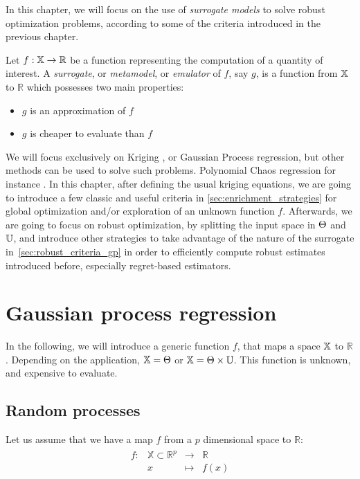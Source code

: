 \documentclass[../../Main_ManuscritThese.tex]{subfiles}
\begin{document}
 In this chapter, we will focus on the use of \emph{surrogate models} to solve robust optimization problems, according to some of the criteria introduced in the previous chapter.
\begin{definition}
  Let $f: \mathbb{X} \rightarrow \mathbb{R}$ be a function representing the computation of a quantity of interest. A \emph{surrogate}, or \emph{metamodel}, or \emph{emulator} of $f$, say $g$, is a function from $\mathbb{X}$ to $\mathbb{R}$ which possesses two main properties:
  \begin{itemize}
  \item $g$ is an approximation of $f$
  \item $g$ is cheaper to evaluate than $f$ 
  \end{itemize}
\end{definition}
We will focus exclusively on Kriging \cite{krige_statistical_1951,matheron_traite_1962}, or Gaussian Process regression, but other methods can be used to solve such problems. Polynomial Chaos regression for instance \cite{wiener_homogeneous_1938,xiu_wiener--askey_2002,sudret_polynomial_2015,miranda_adjoint-based_2016}.
In this chapter, after defining the usual kriging equations, we are going to introduce a few classic and useful criteria in \cref{sec:enrichment_strategies} for global optimization and/or exploration of an unknown function $f$. Afterwards, we are going to focus on robust optimization, by splitting the input space in $\Theta$ and $\mathbb{U}$, and introduce other strategies to take advantage of the nature of the surrogate in~\cref{sec:robust_criteria_gp} in order to efficiently compute robust estimates introduced before, especially regret-based estimators.

\section{Gaussian process regression}
In the following, we will introduce a generic function $f$, that maps a space $\mathbb{X}$ to $\mathbb{R}$. Depending on the application, $\mathbb{X} = \Theta$ or $\mathbb{X} = \Theta \times \mathbb{U}$. This function is unknown, and  expensive to evaluate.

\subsection{Random processes}
Let us assume that we have a map $f$ from a $p$ dimensional space to $\mathbb{R}$:
\begin{align}
  \begin{array}{rrcl}
    f: & \mathbb{X} \subset \mathbb{R}^p& \longrightarrow & \mathbb{R} \\
       & x & \longmapsto & f(x)
  \end{array}
\end{align}
\end{document}
